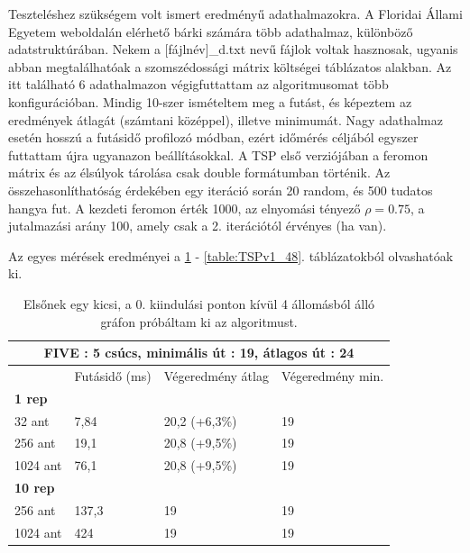Teszteléshez szükségem volt ismert eredményű adathalmazokra. A Floridai Állami Egyetem weboldalán \cite{TSPdataset} elérhető bárki számára több adathalmaz, különböző adatstruktúrában. Nekem a [fájlnév]\_d.txt nevű fájlok voltak hasznosak, ugyanis abban megtalálhatóak a szomszédossági mátrix költségei táblázatos alakban. Az itt található 6 adathalmazon végigfuttattam az algoritmusomat több konfigurációban. Mindig 10-szer ismételtem meg a futást, és képeztem az eredmények átlagát (számtani középpel), illetve minimumát. Nagy adathalmaz esetén hosszú a futásidő profilozó módban, ezért időmérés céljából egyszer futtattam újra ugyanazon beállításokkal. A TSP első verziójában a feromon mátrix és az élsúlyok tárolása csak double formátumban történik. Az összehasonlíthatóság érdekében egy iteráció során 20 random, és 500 tudatos hangya fut. A kezdeti feromon érték 1000, az elnyomási tényező \( \rho = 0.75 \), a jutalmazási arány 100, amely csak a 2. iterációtól érvényes (ha van).

Az egyes mérések eredményei a \ref{table:TSPv1_5} - \ref{table:TSPv1_48}. táblázatokból olvashatóak ki.

\begin{table}[ht!]
	\centering
	\begin{tabular}{|p{2cm}||p{3cm}|p{3.5cm}|p{3.5cm}|}
		\hline
		\multicolumn{4}{|c|}{FIVE : 5 csúcs, minimális út : 19, átlagos út : 24} \\
		\hline
		& Futásidő (ms) & Végeredmény átlag & Végeredmény min.\\
		\hline
		\textbf{1 rep} & & &\\
		32 ant& 7,84 & 20,2 (+6,3\%) & 19\\
		256 ant & 19,1 & 20,8 (+9,5\%) & 19\\
		1024 ant & 76,1 & 20,8 (+9,5\%) &	19\\
		\hline
		\textbf{10 rep} & & &\\
		256 ant & 137,3 & 19 &	19\\
		1024 ant & 424 &	19 &	19\\
		\hline
	\end{tabular}
	\caption{Elsőnek egy kicsi, a 0. kiindulási ponton kívül 4 állomásból álló gráfon próbáltam ki az algoritmust.}
	\label{table:TSPv1_5}
\end{table}

